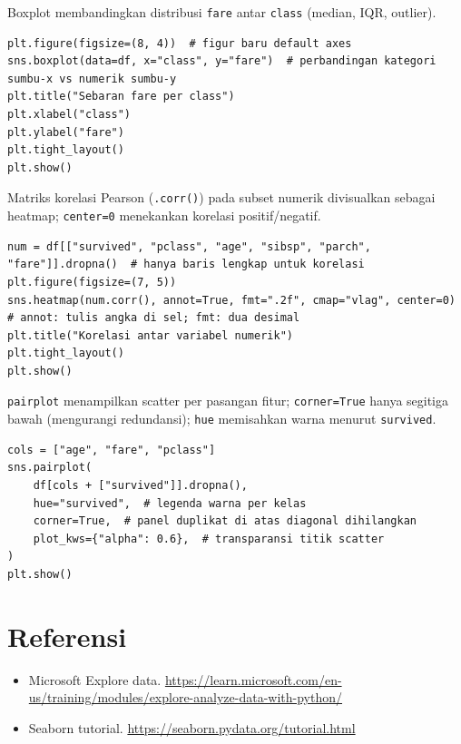 \documentclass[../main.tex]{subfiles}
\begin{document}
\MulaiPenjelasanKode Boxplot membandingkan distribusi \texttt{fare} antar \texttt{class} (median, IQR, outlier). \SelesaiPenjelasanKode

\begin{lstlisting}[caption=Boxplot tarif per kelas kabin]
plt.figure(figsize=(8, 4))  # figur baru default axes
sns.boxplot(data=df, x="class", y="fare")  # perbandingan kategori sumbu-x vs numerik sumbu-y
plt.title("Sebaran fare per class")
plt.xlabel("class")
plt.ylabel("fare")
plt.tight_layout()
plt.show()
\end{lstlisting}

\MulaiPenjelasanKode Matriks korelasi Pearson (\texttt{.corr()}) pada subset numerik divisualkan sebagai heatmap; \texttt{center=0} menekankan korelasi positif/negatif. \SelesaiPenjelasanKode

\begin{lstlisting}[caption=Heatmap korelasi fitur numerik]
num = df[["survived", "pclass", "age", "sibsp", "parch", "fare"]].dropna()  # hanya baris lengkap untuk korelasi
plt.figure(figsize=(7, 5))
sns.heatmap(num.corr(), annot=True, fmt=".2f", cmap="vlag", center=0)  # annot: tulis angka di sel; fmt: dua desimal
plt.title("Korelasi antar variabel numerik")
plt.tight_layout()
plt.show()
\end{lstlisting}

\MulaiPenjelasanKode \texttt{pairplot} menampilkan scatter per pasangan fitur; \texttt{corner=True} hanya segitiga bawah (mengurangi redundansi); \texttt{hue} memisahkan warna menurut \texttt{survived}. \SelesaiPenjelasanKode

\begin{lstlisting}[caption=Pairplot subset (dengan hue survival)]
cols = ["age", "fare", "pclass"]
sns.pairplot(
    df[cols + ["survived"]].dropna(),
    hue="survived",  # legenda warna per kelas
    corner=True,  # panel duplikat di atas diagonal dihilangkan
    plot_kws={"alpha": 0.6},  # transparansi titik scatter
)
plt.show()
\end{lstlisting}



\section{Referensi}

\begin{itemize}[leftmargin=*]
  \item Microsoft Explore data. \url{https://learn.microsoft.com/en-us/training/modules/explore-analyze-data-with-python/}
  \item Seaborn tutorial. \url{https://seaborn.pydata.org/tutorial.html}
\end{itemize}
\end{document}
